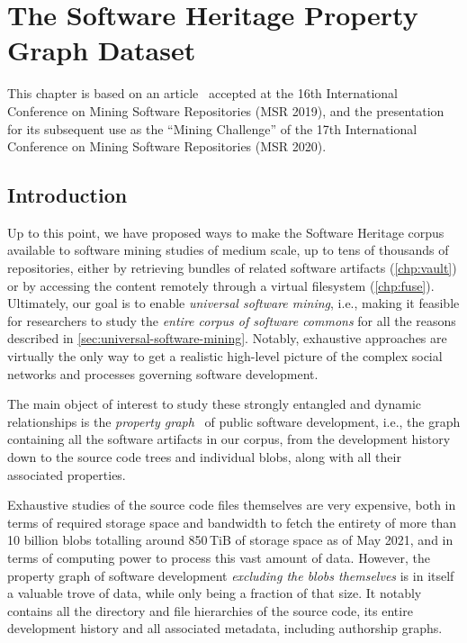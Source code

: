 \chapter{The Software Heritage Property Graph Dataset}%
\label{chp:graph-dataset}

This chapter is based on an article~\cite{swh-msr2019-dataset} accepted at the
16th International Conference on Mining Software Repositories (MSR 2019), and
the presentation~\cite{msr-2020-challenge} for its subsequent use as the
``Mining Challenge'' of the 17th International Conference on Mining Software
Repositories (MSR 2020).

\section{Introduction}

Up to this point, we have proposed ways to make the Software Heritage corpus
available to software mining studies of medium scale, up to tens of thousands
of repositories, either by retrieving bundles of related software artifacts
(\cref{chp:vault}) or by accessing the content remotely through a
virtual filesystem (\cref{chp:fuse}). Ultimately, our goal is to enable
\emph{universal software mining}, i.e., making it feasible for researchers to
study the \emph{entire corpus of software commons} for all the reasons
described in \cref{sec:universal-software-mining}. Notably, exhaustive
approaches are virtually the only way to get a realistic high-level picture of
the complex social networks and processes governing software development.

The main object of interest to study these strongly entangled and dynamic
relationships is the \emph{property
graph}~\cite{angles2018propertygraph,bonifati2018graphquery} of public software
development, i.e., the graph containing all the software artifacts in our
corpus, from the development history down to the source code trees and
individual blobs, along with all their associated properties.

Exhaustive studies of the source code files themselves are very expensive, both
in terms of required storage space and bandwidth to fetch the entirety of more
than 10 billion blobs totalling around 850\,TiB of storage space as of May
2021, and in terms of computing power to process this vast amount of data.
However, the property graph of software development \emph{excluding the blobs
themselves} is in itself a valuable trove of data, while only being a fraction
of that size.  It notably contains all the directory and file hierarchies of
the source code, its entire development history and all associated metadata,
including authorship graphs.

